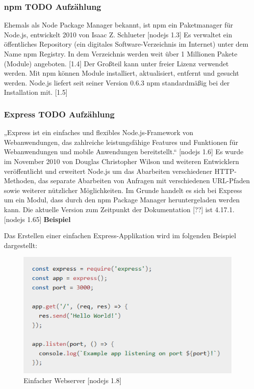 \subsubsection{npm TODO Aufzählung}
Ehemals als Node Package Manager bekannt, ist npm ein Paketmanager für Node.js, entwickelt 2010 von Isaac Z. Schlueter [nodejs 1.3] Es verwaltet ein öffentliches Repository (ein digitales Software-Verzeichnis im Internet) unter dem Name npm Registry. In dem Verzeichnis werden weit über 1 Millionen Pakete (Module) angeboten. [1.4] Der Großteil kann unter freier Lizenz verwendet werden. Mit npm können Module installiert, aktualisiert, entfernt und gesucht werden. Node.js liefert seit seiner Version 0.6.3 npm standardmäßig bei der Installation mit. [1.5]

\subsubsection{Express TODO Aufzählung}
„Express ist ein einfaches und flexibles Node.js-Framework von Webanwendungen, das zahlreiche leistungsfähige Features und Funktionen für Webanwendungen und mobile Anwendungen bereitstellt.“ [nodejs 1.6] Es wurde im November 2010 von Douglas Christopher Wilson und weiteren Entwicklern veröffentlicht und erweitert Node.js um das Abarbeiten verschiedener HTTP-Methoden, das separate Abarbeiten von Anfragen mit verschiedenen URL-Pfaden sowie weiterer nützlicher Möglichkeiten. Im Grunde handelt es sich bei Express um ein Modul, dass durch den npm Package Manager heruntergeladen werden kann. Die aktuelle Version zum Zeitpunkt der Dokumentation [??] ist 4.17.1. [nodejs 1.65] \newline
\newline
\textbf{Beispiel}
 \newline

Das Erstellen einer einfachen Express-Applikation wird im folgenden Beispiel dargestellt:\newline

\begin{figure}[h]
\centering
\includegraphics{images/nodejs_express_einfacherWebserver.PNG}
\caption{Einfacher Webserver [nodejs 1.8]}
\end{figure}


